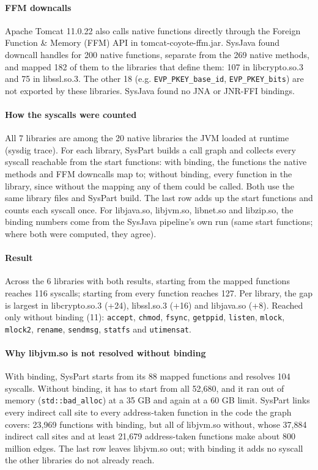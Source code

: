 \documentclass[10pt]{article}
\newcommand{\sysname}{SysJava\xspace}
\begin{document}
\paragraph*{FFM downcalls}
Apache Tomcat 11.0.22 also calls native functions directly through the Foreign Function \& Memory (FFM) API in tomcat-coyote-ffm.jar. \sysname found downcall handles for 200 native functions, separate from the 269 native methods, and mapped 182 of them to the libraries that define them: 107 in libcrypto.so.3 and 75 in libssl.so.3. The other 18 (e.g. \texttt{EVP\_PKEY\_base\_id}, \texttt{EVP\_PKEY\_bits}) are not exported by these libraries. \sysname found no JNA or JNR-FFI bindings.

\paragraph*{How the syscalls were counted}
All 7 libraries are among the 20 native libraries the JVM loaded at runtime (sysdig trace). For each library, SysPart builds a call graph and collects every syscall reachable from the start functions: with binding, the functions the native methods and FFM downcalls map to; without binding, every function in the library, since without the mapping any of them could be called. Both use the same library files and SysPart build. The last row adds up the start functions and counts each syscall once. For libjava.so, libjvm.so, libnet.so and libzip.so, the binding numbers come from the \sysname pipeline's own run (same start functions; where both were computed, they agree).

\paragraph*{Result}
Across the 6 libraries with both results, starting from the mapped functions reaches 116 syscalls; starting from every function reaches 127. Per library, the gap is largest in libcrypto.so.3 (+24), libssl.so.3 (+16) and libjava.so (+8). Reached only without binding (11): \texttt{accept}, \texttt{chmod}, \texttt{fsync}, \texttt{getppid}, \texttt{listen}, \texttt{mlock}, \texttt{mlock2}, \texttt{rename}, \texttt{sendmsg}, \texttt{statfs} and \texttt{utimensat}.

\paragraph*{Why libjvm.so is not resolved without binding}
With binding, SysPart starts from its 88 mapped functions and resolves 104 syscalls. Without binding, it has to start from all 52,680, and it ran out of memory (\texttt{std::bad\_alloc}) at a 35 GB and again at a 60 GB limit. SysPart links every indirect call site to every address-taken function in the code the graph covers: 23,969 functions with binding, but all of libjvm.so without, whose 37,884 indirect call sites and at least 21,679 address-taken functions make about 800 million edges. The last row leaves libjvm.so out; with binding it adds no syscall the other libraries do not already reach.
\end{document}
